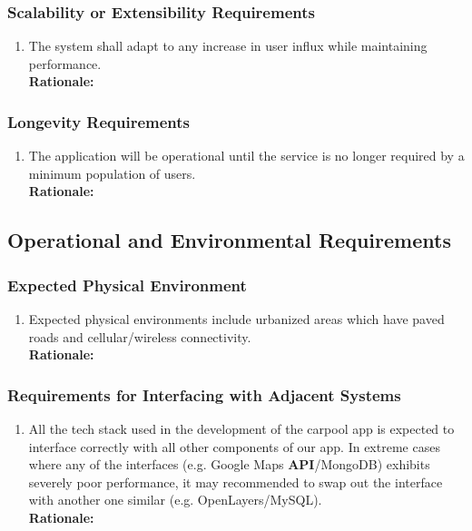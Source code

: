 \documentclass[]{article}
\begin{document}
\subsubsection{Scalability or Extensibility Requirements}
\label{ssub:scalability_or_extensibility_requirements}
\begin{enumerate}[{PR-SE}1. ]
	\item The system shall adapt to any increase in user influx while maintaining performance.\\
	{\bf Rationale:} 
\end{enumerate}

\subsubsection{Longevity Requirements}
\label{ssub:longevity_requirements}
\begin{enumerate}[{PR-L}1. ]
	\item The application will be operational until the service is no longer required by a minimum population of users.\\
	{\bf Rationale:} 
\end{enumerate}


\subsection{Operational and Environmental Requirements}
\label{sub:operational_and_environmental_requirements}

\subsubsection{Expected Physical Environment}
\label{ssub:expected_physical_environment}
\begin{enumerate}[{OE-EPE}1. ]
	\item Expected physical environments include urbanized areas which have paved roads and cellular/wireless connectivity.\\
	{\bf Rationale:} 
\end{enumerate}

\subsubsection{Requirements for Interfacing with Adjacent Systems}
\label{ssub:requirements_for_interfacing_with_adjacent_systems}
\begin{enumerate}[{OE-IA}1. ]
	\item All the tech stack used in the development of the carpool app is expected to interface correctly with all other components of our app. In extreme cases where any of the interfaces (e.g. Google Maps \textbf{API}/MongoDB) exhibits severely poor performance, it may recommended to swap out the interface with another one similar (e.g. OpenLayers/MySQL).\\
	{\bf Rationale:} 
\end{enumerate}
\end{document}
